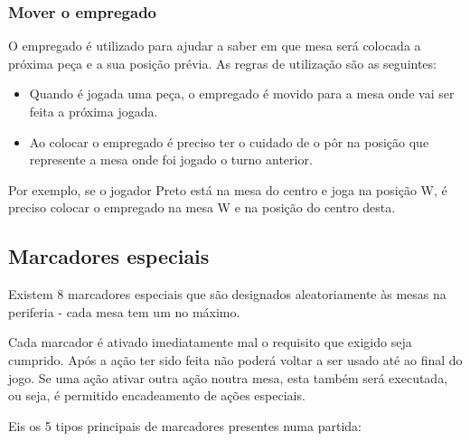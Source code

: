 \documentclass[a4paper]{article}
\begin{document}
\newpage
\subsubsection{Mover o empregado}
O empregado é utilizado para ajudar a saber em que mesa será colocada a próxima peça e a sua posição prévia. As regras de utilização são as seguintes:
\begin{itemize}
\item Quando é jogada uma peça, o empregado é movido para a mesa onde vai ser feita a próxima jogada.
\item Ao colocar o empregado é preciso ter o cuidado de o pôr na posição que represente a mesa onde foi jogado o turno anterior.
\end{itemize}

Por exemplo, se o jogador Preto está na mesa do centro e joga na posição W, é preciso colocar o empregado na mesa W e na posição do centro desta.

\subsection{Marcadores especiais}

Existem 8 marcadores especiais que são designados aleatoriamente às mesas na periferia - cada mesa tem um no máximo. 

Cada marcador é ativado imediatamente mal o requisito que exigido seja cumprido. Após a ação ter sido feita não poderá voltar a ser usado até ao final do jogo. Se uma ação ativar outra ação noutra mesa, esta também será executada, ou seja, é permitido encadeamento de ações especiais. \newline

Eis os 5 tipos principais de marcadores presentes numa partida: \newline
\end{document}
